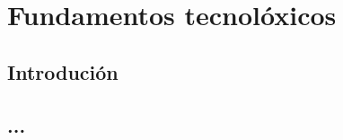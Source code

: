 %
%
\chapter[Fundamentos tecnolóxicos]{
	Fundamentos tecnolóxicos
	\label{ch.fts}
}

%
%
\section[Introdución]{
	Introdución}

\section[...]{
	...}
